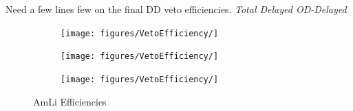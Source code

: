 {\color{red} Need a few lines few on the final DD veto efficiencies. \textit{Total Delayed OD-Delayed}}

\begin{figure}[!ht]
    \centering
    \begin{subfigure}[b]{0.49\textwidth}
        \centering
        \texttt{[image: figures/VetoEfficiency/]}
        \caption{}
        \label{fig:VetoEff/DDEfficiency_All}
    \end{subfigure}
    \hfill
    \begin{subfigure}[b]{0.49\textwidth}
        \centering
        \texttt{[image: figures/VetoEfficiency/]}
        \caption{}
        \label{fig:VetoEff/DDEfficiency_Delayed}
    \end{subfigure}
    \hfill
    \begin{subfigure}[b]{0.49\textwidth}
        \centering
        \texttt{[image: figures/VetoEfficiency/]}
        \caption{}
        \label{fig:VetoEff/DDEfficiency_ODDelayed}
    \end{subfigure}
    \caption{AmLi Efficiencies}
    \label{fig:VetoEff/DDEfficiencies}
\end{figure}

